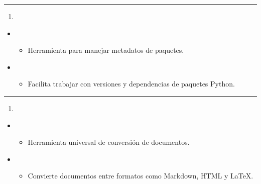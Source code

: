 \documentclass[a4paper,10pt,spanish]{sphinxmanual}
\begin{document}
\bigskip\hrule\bigskip

\begin{enumerate}
%
\setcounter{enumi}{14}
\item {} 
\sphinxAtStartPar
{}

\end{enumerate}
\begin{itemize}
\item {} 
\sphinxAtStartPar
{}
\begin{itemize}
\item {} 
\sphinxAtStartPar
Herramienta para manejar metadatos de paquetes.

\end{itemize}

\item {} 
\sphinxAtStartPar
{}
\begin{itemize}
\item {} 
\sphinxAtStartPar
Facilita trabajar con versiones y dependencias de paquetes Python.

\end{itemize}

\end{itemize}


\bigskip\hrule\bigskip

\begin{enumerate}
%
\setcounter{enumi}{15}
\item {} 
\sphinxAtStartPar
{}

\end{enumerate}
\begin{itemize}
\item {} 
\sphinxAtStartPar
{}
\begin{itemize}
\item {} 
\sphinxAtStartPar
Herramienta universal de conversión de documentos.

\end{itemize}

\item {} 
\sphinxAtStartPar
{}
\begin{itemize}
\item {} 
\sphinxAtStartPar
Convierte documentos entre formatos como Markdown, HTML y LaTeX.

\end{itemize}

\end{itemize}
\end{document}
